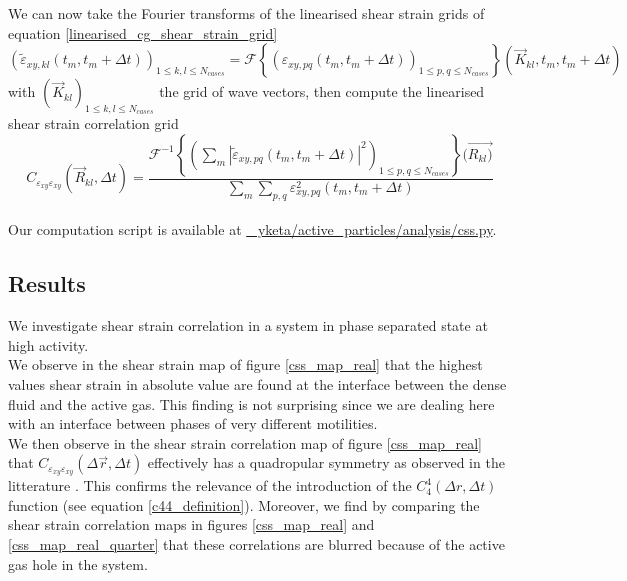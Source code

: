 \documentclass[class=report, float=false, crop=false]{standalone}
\begin{document}
We can now take the Fourier transforms of the linearised shear strain grids of equation \ref{linearised_cg_shear_strain_grid}
\begin{equation}
(\tilde{\varepsilon}_{xy,kl}(t_m, t_m + \Delta t))_{1 \leq k, l \leq N_{cases}} = \mathcal{F}\left\{(\varepsilon_{xy,pq}(t_m, t_m + \Delta t))_{1 \leq p, q \leq N_{cases}}\right\}(\vec{K}_{kl}, t_m, t_m + \Delta t)
\end{equation}
with $(\vec{K}_{kl})_{1 \leq k, l \leq N_{cases}}$ the grid of wave vectors, then compute the linearised shear strain correlation grid
\begin{equation}
C_{\varepsilon_{xy}\varepsilon_{xy}}(\vec{R}_{kl}, \Delta t) = \frac{\mathcal{F}^{-1}\left\{\left(\sum_m |\tilde{\varepsilon}_{xy,pq}(t_m, t_m + \Delta t)|^2\right)_{1 \leq p, q \leq N_{cases}}\right\}(\vec{R_{kl})}}{\sum_m\sum_{p, q} \varepsilon_{xy, pq}^2(t_m, t_m + \Delta t)}
\end{equation}
\mbox{}\\

Our computation script is available at \href{https://github.com/yketa/active_particles/blob/master/analysis/css.py}{{\faGithub~ yketa/active\_particles/analysis/css.py}}.

\subsection{Results}


We investigate shear strain correlation in a system in phase separated state at high activity.\\

We observe in the shear strain map of figure \ref{css_map_real} that the highest values shear strain in absolute value are found at the interface between the dense fluid and the active gas. This finding is not surprising since we are dealing here with an interface between phases of very different motilities.\\

We then observe in the shear strain correlation map of figure \ref{css_map_real} that $C_{\varepsilon_{xy}\varepsilon_{xy}}(\Delta \vec{r}, \Delta t)$ effectively has a quadropular symmetry as observed in the litterature \cite{illing2016strain, hassani2018long}. This confirms the relevance of the introduction of the $C_4^4(\Delta r, \Delta t)$ function (see equation \ref{c44_definition}). Moreover, we find by comparing the shear strain correlation maps in figures \ref{css_map_real} and \ref{css_map_real_quarter} that these correlations are blurred because of the active gas hole in the system.
\end{document}
